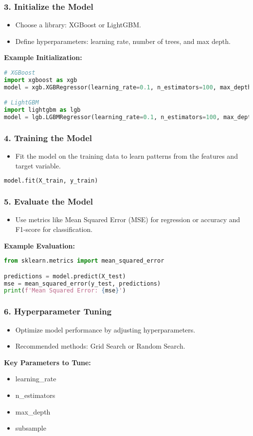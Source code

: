 \documentclass[aspectratio=169]{beamer}
\begin{document}
\begin{frame}[fragile]
    \frametitle{3. Initialize the Model}
    \begin{itemize}
        \item Choose a library: XGBoost or LightGBM.
        \item Define hyperparameters: learning rate, number of trees, and max depth.
    \end{itemize}
    \textbf{Example Initialization:}
    \begin{lstlisting}[language=Python]
# XGBoost
import xgboost as xgb
model = xgb.XGBRegressor(learning_rate=0.1, n_estimators=100, max_depth=3)

# LightGBM
import lightgbm as lgb
model = lgb.LGBMRegressor(learning_rate=0.1, n_estimators=100, max_depth=3)
    \end{lstlisting}
\end{frame}

\begin{frame}[fragile]
    \frametitle{4. Training the Model}
    \begin{itemize}
        \item Fit the model on the training data to learn patterns from the features and target variable.
    \end{itemize}
    \begin{lstlisting}[language=Python]
model.fit(X_train, y_train)
    \end{lstlisting}
\end{frame}

\begin{frame}[fragile]
    \frametitle{5. Evaluate the Model}
    \begin{itemize}
        \item Use metrics like Mean Squared Error (MSE) for regression or accuracy and F1-score for classification.
    \end{itemize}
    \textbf{Example Evaluation:}
    \begin{lstlisting}[language=Python]
from sklearn.metrics import mean_squared_error

predictions = model.predict(X_test)
mse = mean_squared_error(y_test, predictions)
print(f'Mean Squared Error: {mse}')
    \end{lstlisting}
\end{frame}

\begin{frame}
    \frametitle{6. Hyperparameter Tuning}
    \begin{itemize}
        \item Optimize model performance by adjusting hyperparameters.
        \item Recommended methods: Grid Search or Random Search.
    \end{itemize}
    \textbf{Key Parameters to Tune:}
    \begin{itemize}
        \item learning\_rate
        \item n\_estimators
        \item max\_depth
        \item subsample
    \end{itemize}
\end{frame}
\end{document}
